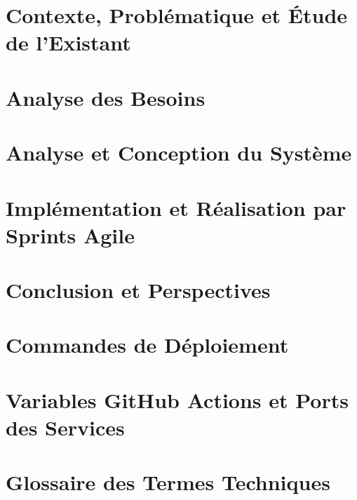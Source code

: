 \documentclass[12pt,a4paper]{./tpl/isipfe}
\begin{document}
    \chapter{Contexte, Problématique et Étude de l'Existant}
    \label{chap:contexte}
    
    \clearpage

    \chapter{Analyse des Besoins}
    \label{chap:besoins}
    
    \clearpage

    \chapter{Analyse et Conception du Système}
    \label{chap:conception}
    
    \clearpage

    \chapter{Implémentation et Réalisation par Sprints Agile}
    \label{chap:implementation}
    
    \clearpage

    \chapter*{Conclusion et Perspectives}
    \adjustmtc
    
    \clearpage

    \clearpage
    \printbibliography[title={Bibliographie}]

    \appendix

    \chapter{Commandes de Déploiement}
    \label{annex:deploy}
    
    \clearpage

    \chapter{Variables GitHub Actions et Ports des Services}
    \label{annex:vars}
    
    \clearpage

    \chapter{Glossaire des Termes Techniques}
    \label{annex:glossaire}
    
    \clearpage

    \backmatter
    
\end{document}

